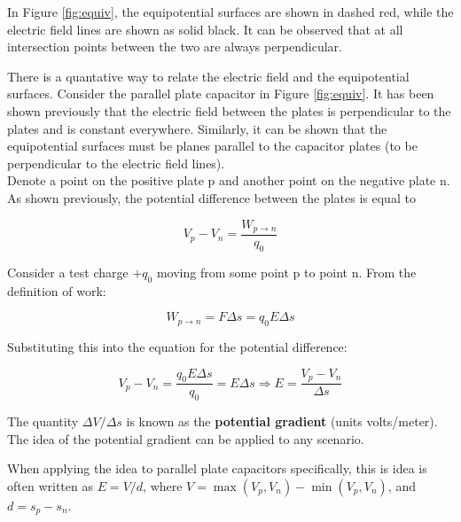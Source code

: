 \documentclass[12pt, a4paper]{article}
\theoremstyle{definition}
\begin{document}
In Figure \ref{fig:equiv}, the equipotential surfaces are shown in dashed red, while the electric field lines are shown as solid black.
It can be observed that at all intersection points between the two are always perpendicular.

There is a quantative way to relate the electric field and the equipotential surfaces.
Consider the parallel plate capacitor in Figure \ref{fig:equiv}.
It has been shown previously that the electric field between the plates is perpendicular to the plates and is constant everywhere.
Similarly, it can be shown that the equipotential surfaces must be planes parallel to the capacitor plates (to be perpendicular to the electric field lines).\\

Denote a point on the positive plate p and another point on the negative plate n.
As shown previously, the potential difference between the plates is equal to

\[V_p - V_n = \frac{W_{p \rightarrow n}}{q_0}\]

Consider a test charge $+q_0$ moving from some point p to point n.
From the definition of work:

\[W_{p \rightarrow n} = F\Delta s = q_0E\Delta s\]

Substituting this into the equation for the potential difference:

\[V_p - V_n = \frac{q_0E\Delta s}{q_0} = E\Delta s \Rightarrow E = \frac{V_p - V_n}{\Delta s}\]

The quantity $\Delta V / \Delta s$ is known as the \textbf{potential gradient} (units volts/meter).
The idea of the potential gradient can be applied to any scenario.

When applying the idea to parallel plate capacitors specifically, this is idea is often written as $E=V/d$, where $V = \max(V_p, V_n) - \min(V_p, V_n)$, and $d = s_p - s_n$.
\end{document}
